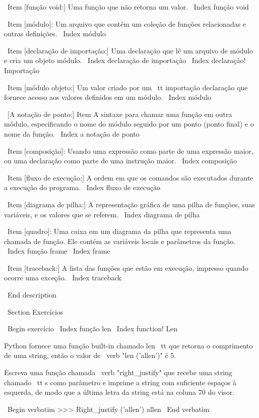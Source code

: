 \documentclass[10pt]{book}
\begin{document}
\begin {itemize}
{\ Item [função void:] Uma função que não retorna um valor.
\ Index {função void}

\ Item [módulo]: Um arquivo que contém um
coleção de funções relacionadas e outras definições.
\ Index {módulo}

\ Item [declaração de importação:] Uma declaração que lê um arquivo de módulo e cria
um objeto módulo.
\ Index {declaração de importação}
\ Index {declaração! Importação}

\ Item [módulo objeto:] Um valor criado por um {\ tt importação} declaração
que fornece acesso aos valores definidos em um módulo.
\ Index {módulo}

\ [A notação de ponto:] Item A sintaxe para chamar uma função em outra
módulo, especificando o nome do módulo seguido por um ponto (ponto final) e
o nome da função.
\ Index {} a notação de ponto

\ Item [composição]: Usando uma expressão como parte de uma expressão maior,
ou uma declaração como parte de uma instrução maior.
\ Index {composição}

\ Item [fluxo de execução:] A ordem em que os comandos são executados durante
a execução do programa.
\ Index {fluxo de execução}

\ Item [diagrama de pilha:] A representação gráfica de uma pilha de funções,
suas variáveis, e os valores que se referem.
\ Index {diagrama de pilha}

\ Item [quadro]: Uma caixa em um diagrama da pilha que representa uma chamada de função.
Ele contém as variáveis ​​locais e parâmetros da função.
\ Index {função frame}
\ Index {frame}

\ Item [traceback:] A lista das funções que estão em execução,
impresso quando ocorre uma exceção.
\ Index {} traceback


\ End {description}


\ Section {Exercícios}

\ Begin {} exercício
\ Index {função len}
\ Index {function! Len}

Python fornece uma função built-in chamado {len \ tt} que
retorna o comprimento de uma string, então o valor de \ verb "len ('allen')" é 5.

Escreva uma função chamada \ verb "right_justify" que recebe uma string
chamado {\ tt s} como parâmetro e imprime a string com suficiente
espaços à esquerda, de modo que a última letra da string está na coluna 70
do visor.

\ Begin {verbatim}
>>> Right_justify ('allen')
                                                                 allen
\ End {verbatim}

}
\end{itemize}
\end{document}
